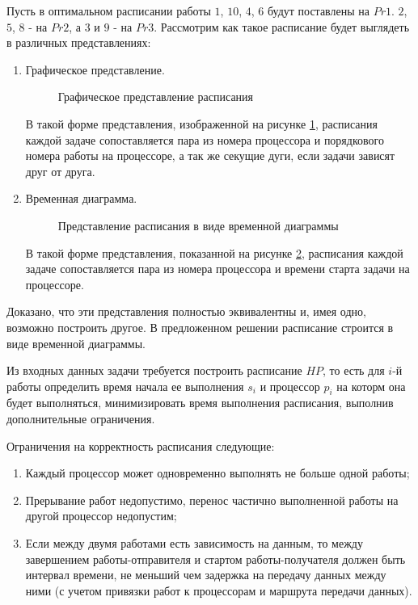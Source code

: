 Пусть в оптимальном расписании работы $1$, $10$, $4$, $6$ будут поставлены на $Pr1$. $2$, $5$, $8$ - на $Pr2$, а $3$ и $9$ - на $Pr3$. Рассмотрим как такое расписание будет выглядеть в различных представлениях:
\begin{enumerate}
    \item Графическое представление.

    \begin{figure}[!htbp]
        \caption{Графическое представление расписания}
        \label{fig:graphical-form}
    \end{figure}
    В такой форме представления, изображенной на рисунке \ref{fig:graphical-form}, расписания каждой задаче сопоставляется пара из номера процессора и порядкового номера работы на процессоре, а так же секущие дуги, если задачи зависят друг от друга. 
    \item Временная диаграмма.

    \begin{figure}[!htbp]
        \caption{Представление расписания в виде временной диаграммы}
        \label{fig:time-diagram}
    \end{figure}
    В такой форме представления, показанной на рисунке \ref{fig:time-diagram}, расписания каждой задаче сопоставляется пара из номера процессора и времени старта задачи на процессоре.
\end{enumerate}
Доказано, что эти представления полностью эквивалентны и, имея одно, возможно построить другое. В предложенном решении расписание строится в виде временной диаграммы.

Из входных данных задачи требуется построить расписание $HP$, то есть для $i$-й работы определить время начала ее выполнения $s_i$ и процессор $p_i$ на которм она будет выполняться, минимизировать время выполнения расписания, выполнив дополнительные ограничения.


Ограничения на корректность расписания следующие:
\begin{enumerate}
    \item Каждый процессор может одновременно выполнять не больше одной работы;
    \item Прерывание работ недопустимо, перенос частично выполненной работы на другой процессор недопустим;
    \item Если между двумя работами есть зависимость на данным, то между завершением работы-отправителя и стартом работы-получателя должен быть интервал времени, не меньший чем задержка на передачу данных между ними (с учетом привязки работ к процессорам и маршрута передачи данных).
\end{enumerate}

